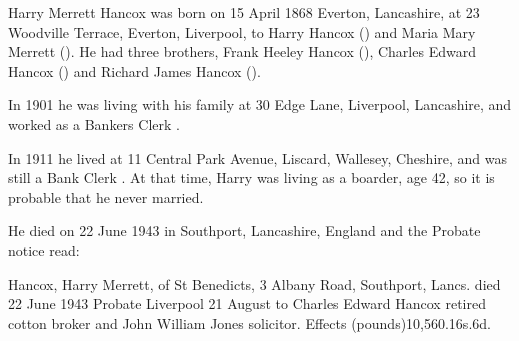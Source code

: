 
Harry Merrett Hancox was born on 15 April 1868 	Everton, Lancashire, at 23 Woodville Terrace, Everton, Liverpool, to Harry Hancox () and Maria Mary Merrett ()\cite{HMHancoxBirth}.  He had three brothers, Frank Heeley Hancox (), Charles Edward Hancox () and Richard James Hancox ().

In 1901 he was living with his family at 30 Edge Lane, Liverpool, Lancashire, and worked as a Bankers Clerk \cite{HMHancoxOccupation}.

In 1911 he lived at 11 Central Park Avenue, Liscard, Wallesey, Cheshire, and was still a Bank Clerk \cite{HMHancoxResidence}. At that time, Harry was living as a boarder, age 42, so it is probable that he never married. 

He died on 22 June 1943 in Southport, Lancashire, England \cite{HarryMerrettHancoxDeath} and the Probate notice read:

Hancox, Harry Merrett, of St Benedicts, 3 Albany Road, Southport, Lancs. died 22 June 1943 Probate Liverpool 21 August to Charles Edward Hancox retired cotton broker and John William Jones solicitor. Effects (pounds)10,560.16s.6d.


